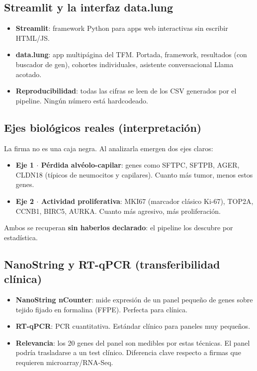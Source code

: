 \documentclass[11pt, a4paper]{article}
\begin{document}
\subsection{Streamlit y la interfaz data.lung}

\begin{itemize}[leftmargin=1.2em, itemsep=2pt]
  \item \textbf{Streamlit}: framework Python para apps web interactivas sin escribir HTML/JS.
  \item \textbf{data.lung}: app multip\'agina del TFM. Portada, framework, resultados (con buscador de gen), cohortes individuales, asistente conversacional Llama acotado.
  \item \textbf{Reproducibilidad}: todas las cifras se leen de los CSV generados por el pipeline. Ning\'un n\'umero est\'a hardcodeado.
\end{itemize}

\subsection{Ejes biol\'ogicos reales (interpretaci\'on)}

La firma no es una caja negra. Al analizarla emergen dos ejes claros:

\begin{itemize}[leftmargin=1.2em, itemsep=2pt]
  \item \textbf{Eje 1 $\cdot$ P\'erdida alv\'eolo-capilar}: genes como SFTPC, SFTPB, AGER, CLDN18 (t\'ipicos de neumocitos y capilares). Cuanto m\'as tumor, menos estos genes.
  \item \textbf{Eje 2 $\cdot$ Actividad proliferativa}: MKI67 (marcador cl\'asico Ki-67), TOP2A, CCNB1, BIRC5, AURKA. Cuanto m\'as agresivo, m\'as proliferaci\'on.
\end{itemize}

Ambos se recuperan \textbf{sin haberlos declarado}: el pipeline los descubre por estad\'istica.

\subsection{NanoString y RT-qPCR (transferibilidad cl\'inica)}

\begin{itemize}[leftmargin=1.2em, itemsep=2pt]
  \item \textbf{NanoString nCounter}: mide expresi\'on de un panel peque\~no de genes sobre tejido fijado en formalina (FFPE). Perfecta para cl\'inica.
  \item \textbf{RT-qPCR}: PCR cuantitativa. Est\'andar cl\'inico para paneles muy peque\~nos.
  \item \textbf{Relevancia}: los 20 genes del panel son medibles por estas t\'ecnicas. El panel podr\'ia trasladarse a un test cl\'inico. Diferencia clave respecto a firmas que requieren microarray/RNA-Seq.
\end{itemize}
\end{document}
